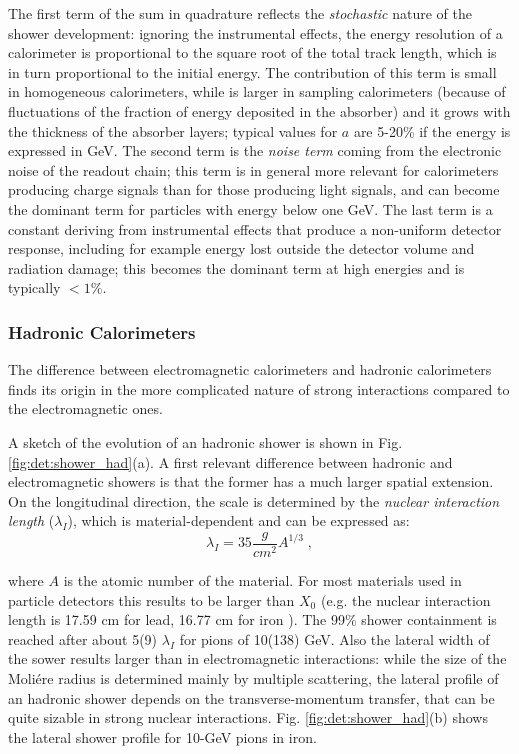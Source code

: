 The first term of the sum in quadrature reflects the \textit{stochastic} nature of the shower development: ignoring the instrumental effects, the energy resolution of a calorimeter is proportional to the square root of the total track length, which is in turn proportional to the initial energy. The contribution of this term is small in homogeneous calorimeters, while is larger in sampling calorimeters (because of fluctuations of the fraction of energy deposited in the absorber) and it grows with the thickness of the absorber layers; typical values for $a$ are 5-20\% if the energy is expressed in GeV. The second term is the \textit{noise term} coming from the electronic noise of the readout chain; this term is in general more relevant for calorimeters producing charge signals than for those producing light signals, and can become the dominant term for particles with energy below one GeV. The last term is a constant deriving from instrumental effects that produce a non-uniform detector response, including for example energy lost outside the detector volume and radiation damage; this becomes the dominant term at high energies and is typically $<1\%$. 



\subsubsection*{Hadronic Calorimeters}

The difference between electromagnetic calorimeters and hadronic calorimeters finds its origin in the more complicated nature of strong interactions compared to the electromagnetic ones. 

A sketch of the evolution of an hadronic shower is shown in Fig. \ref{fig:det:shower_had}(a). A first relevant difference between hadronic and electromagnetic showers is that the former has a much larger spatial extension. On the longitudinal direction, the scale is determined by the \textit{nuclear interaction length} ($\lambda_I$), which is material-dependent and can be expressed as:
\begin{equation}
\lambda_I = 35 \frac{g}{cm^2} A^{1/3} \; ,
\end{equation}

where $A$ is the atomic number of the material. For most materials used in particle detectors this results to be larger than $X_0$ (e.g. the nuclear interaction length is 17.59 cm for lead, 16.77 cm for iron \cite{Patrignani:2016xqp}). The 99\% shower containment is reached after about 5(9) $\lambda_I$ for pions of 10(138) GeV. Also the lateral width of the sower results larger than in electromagnetic interactions: while the size of the Moli\'ere radius is determined mainly by multiple scattering, the lateral profile of an hadronic shower depends on the transverse-momentum transfer, that can be quite sizable in strong nuclear interactions. Fig. \ref{fig:det:shower_had}(b) shows the lateral shower profile for 10-GeV pions in iron.

